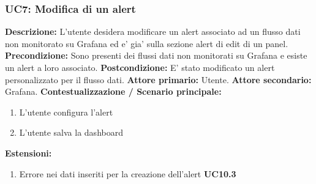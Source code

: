                 \subsubsection{UC7: Modifica di un alert}
                    \textbf{Descrizione:} L’utente desidera modificare un alert associato ad un flusso dati non monitorato su Grafana ed e’ gia’ sulla sezione alert di edit di un panel\pedice.
                    \newline
                    \textbf{Precondizione:} Sono presenti dei flussi dati non monitorati su Grafana e esiste un alert a loro associato.
                    \newline
                    \textbf{Postcondizione:} E’ stato modificato un alert personalizzato per il flusso dati.
                    \newline
                    \textbf{Attore primario:} Utente.
                    \newline
                    \textbf{Attore secondario:} Grafana.
                    \newline
                    \textbf{Contestualizzazione / Scenario principale:} \begin{enumerate}
                            \item L’utente configura l’alert 
                            \item L’utente salva la dashboard
                        \end{enumerate}
                    
                    \textbf{Estensioni:} 
                    \begin{enumerate}
                            \item Errore nei dati inseriti per la creazione dell'alert \textbf{UC10.3}
                        \end{enumerate}
                        

